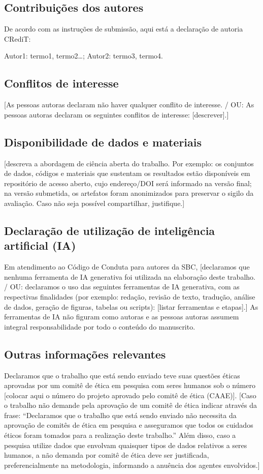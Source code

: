 \documentclass[11pt,a4paper,brazilian]{article}
\begin{document}
\subsection*{Contribuições dos autores}
De acordo com as instruções de submissão, aqui está a declaração de autoria CRediT:

Autor1: termo1, termo2\ldots; Autor2: termo3, termo4.

\subsection*{Conflitos de interesse}
[As pessoas autoras declaram não haver qualquer conflito de interesse. / OU: As pessoas autoras declaram os seguintes conflitos de interesse: [descrever].]

\subsection*{Disponibilidade de dados e materiais}
[descreva a abordagem de ciência aberta do trabalho. Por exemplo: os conjuntos de dados, códigos e materiais que sustentam os resultados estão disponíveis em repositório de acesso aberto, cujo endereço/DOI será informado na versão final; na versão submetida, os artefatos foram anonimizados para preservar o sigilo da avaliação. Caso não seja possível compartilhar, justifique.]

\subsection*{Declaração de utilização de inteligência artificial (IA)}
Em atendimento ao Código de Conduta para autores da SBC, [declaramos que nenhuma ferramenta de IA generativa foi utilizada na elaboração deste trabalho. / OU: declaramos o uso das seguintes ferramentas de IA generativa, com as respectivas finalidades (por exemplo: redação, revisão de texto, tradução, análise de dados, geração de figuras, tabelas ou scripts): [listar ferramentas e etapas].] As ferramentas de IA não figuram como autoras e as pessoas autoras assumem integral responsabilidade por todo o conteúdo do manuscrito.

\subsection*{Outras informações relevantes}
Declaramos que o trabalho que está sendo enviado teve suas questões éticas aprovadas por um comitê de ética em pesquisa com seres humanos sob o número [colocar aqui o número do projeto aprovado pelo comitê de ética (CAAE)]. [Caso o trabalho não demande pela aprovação de um comitê de ética indicar através da frase: ``Declaramos que o trabalho que está sendo enviado não necessita da aprovação de comitês de ética em pesquisa e asseguramos que todos os cuidados éticos foram tomados para a realização deste trabalho.'' Além disso, caso a pesquisa utilize dados que envolvam quaisquer tipos de dados relativos a seres humanos, a não demanda por comitê de ética deve ser justificada, preferencialmente na metodologia, informando a anuência dos agentes envolvidos.]
\end{document}
